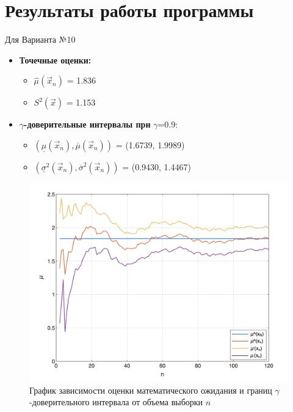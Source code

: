 \chapter{Результаты работы программы}

Для Варианта №10

\begin{itemize}[label=]
    \item \textbf{Точечные оценки:}
    \begin{itemize}[label=]
        \item $\hat\mu (\vec x_n)$ = 1.836
        \item $S^2(\vec x)$ = 1.153
    \end{itemize}
    \item \textbf{$\gamma$-доверительные интервалы при} $\gamma$=0.9:
    \begin{itemize}[label=]
        \item $(\underline\mu (\vec x_n), \overline\mu (\vec x_n))$ = (1.6739, 1.9989)
        \item $(\underline\sigma^2 (\vec x_n), \overline\sigma^2 (\vec x_n))$ = (0.9430, 1.4467)
    \end{itemize}
\end{itemize}

\begin{figure}[h]
	\centering
	\includegraphics[scale=0.75]{images/mu.png}
	\caption{График зависимости оценки математического ожидания и границ $\gamma$-доверительного интервала от объема выборки $n$}
	\label{fig:histo}
\end{figure}

